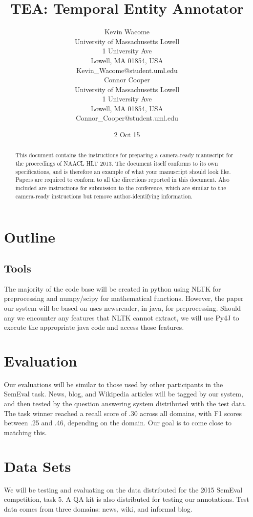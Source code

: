 \documentclass[11pt,letterpaper]{article}
\title{TEA: Temporal Entity Annotator}
\author{Kevin Wacome\\
	    University of Massachusetts Lowell\\
	    1 University Ave\\
	    Lowell, MA 01854, USA\\
	    Kevin\_Wacome@student.uml.edu\\
	  \And
		Connor Cooper\\
	  	University of Massachusetts Lowell\\
	  	1 University Ave\\
	  	Lowell, MA 01854, USA\\
		Connor\_Cooper@student.uml.edu\\}
\date{2 Oct 15}
\begin{document}
\maketitle
\begin{abstract}
  This document contains the instructions for preparing a camera-ready
  manuscript for the proceedings of NAACL HLT 2013.  The document itself conforms
  to its own specifications, and is therefore an example of what
  your manuscript should look like.  Papers are required to conform to
  all the directions reported in this document.  Also included are instructions for
  submission to the conference, which are similar to the camera-ready instructions
  but remove author-identifying information.
\end{abstract}

\section{Outline}

\subsection{Tools}

The majority of the code base will be created in python using NLTK for preprocessing and numpy/scipy for mathematical functions. However, the paper our system will be based on uses newsreader, in java, for preprocessing. Should any we encounter any features that NLTK cannot extract, we will use Py4J to execute the appropriate java code and access those features. 

\section{Evaluation}

Our evaluations will be similar to those used by other participants in the SemEval task. News, blog, and Wikipedia articles will be tagged by our system, and then tested by the question answering system distributed with the test data. The task winner reached a recall score of .30 across all domains, with F1 scores between .25 and .46, depending on the domain. Our goal is to come close to matching this.

\section{Data Sets}

We will be testing and evaluating on the data distributed for the 2015 SemEval competition, task 5. A QA kit is also distributed for testing our annotations. Test data comes from three domains: news, wiki, and informal blog. 
\end{document}
